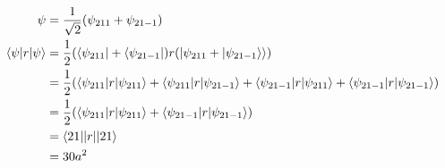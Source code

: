 \documentclass{article}
\begin{document}
\begin{align*}
  \psi                     & = \frac{1}{\sqrt{2}} (\psi_{211} + \psi_{21{-1}})                                                                                                                                     \\
  \braket{\psi | r | \psi} & = \frac{1}{2} (\bra{\psi_{211}} + \bra{\psi_{21{-1}}}) r (\ket{\psi_{211} + \ket{\psi_{21{-1}}}})                                                                                     \\
                           & = \frac{1}{2} (\braket{\psi_{211} | r | \psi_{211}} + \braket{\psi_{211} | r | \psi_{21{-1}}} + \braket{\psi_{21{-1}} | r | \psi_{211}} + \braket{\psi_{21{-1}} | r | \psi_{21{-1}}}) \\
                           & = \frac{1}{2} (\braket{\psi_{211} | r | \psi_{211}} + \braket{\psi_{21{-1}} | r | \psi_{21{-1}}})                                                                                     \\
                           & = \braket{21||r||21}                                                                                                                                                                  \\
                           & = 30 a^2
\end{align*}

\subsection{}
\end{document}

